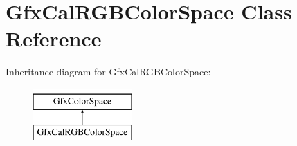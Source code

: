 \hypertarget{class_gfx_cal_r_g_b_color_space}{}\section{Gfx\+Cal\+R\+G\+B\+Color\+Space Class Reference}
\label{class_gfx_cal_r_g_b_color_space}
Inheritance diagram for Gfx\+Cal\+R\+G\+B\+Color\+Space\+:\begin{figure}[H]
\begin{center}
\leavevmode
\includegraphics[height=2.000000cm]{class_gfx_cal_r_g_b_color_space}
\end{center}
\end{figure}
